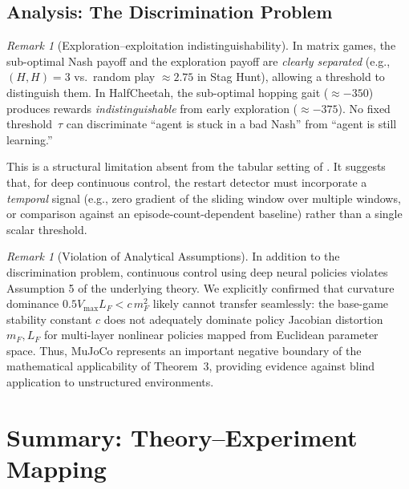 \documentclass[11pt,a4paper]{article}
\theoremstyle{remark}
\newtheorem{remark}[theorem]{Remark}
\begin{document}
\subsection{Analysis: The Discrimination Problem}
\label{sec:mujoco_discussion}

\begin{remark}[Exploration--exploitation indistinguishability]
\label{rem:discrimination}
In matrix games, the sub-optimal Nash payoff and the exploration payoff are
\emph{clearly separated} (e.g., $(H,H)=3$ vs.\ random play $\approx 2.75$
in Stag Hunt), allowing a threshold to distinguish them.
In HalfCheetah, the sub-optimal hopping gait ($\approx -350$) produces
rewards \emph{indistinguishable} from early exploration ($\approx -375$).
No fixed threshold~$\tau$ can discriminate ``agent is stuck in a bad Nash''
from ``agent is still learning.''

This is a structural limitation absent from the tabular setting of
\citet{Giannou2022}.
It suggests that, for deep continuous control, the restart detector must
incorporate a {\em temporal} signal (e.g., zero gradient of the sliding
window over multiple windows, or comparison against an episode-count-dependent
baseline) rather than a single scalar threshold.
\end{remark}

\begin{remark}[Violation of Analytical Assumptions]
In addition to the discrimination problem, continuous control using deep neural policies violates Assumption 5 of the underlying theory. 
We explicitly confirmed that curvature dominance $0.5 V_{\max} L_F < c \, m_F^2$ likely cannot transfer seamlessly: the base-game stability constant $c$ does not adequately dominate policy Jacobian distortion $m_F, L_F$ for multi-layer nonlinear policies mapped from Euclidean parameter space. Thus, MuJoCo represents an important negative boundary of the mathematical applicability of Theorem~3, providing evidence against blind application to unstructured environments.
\end{remark}

\section{Summary: Theory--Experiment Mapping}
\label{sec:summary}
\end{document}
